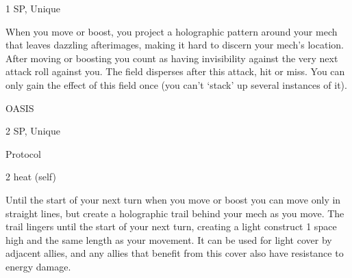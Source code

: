 1 SP, Unique
 
When you move or boost, you project a holographic pattern around your mech that leaves  
dazzling afterimages, making it hard to discern your mech’s location. After moving or boosting  
you count as having invisibility against the very next attack roll against you. The field disperses  
after this attack, hit or miss. You can only gain the effect of this field once (you can’t ‘stack’ up  
several instances of it).
 

OASIS  

2 SP, Unique
 
Protocol
 
2 heat (self)
 
Until the start of your next turn when you move or boost you can move only in straight lines, but  
create a holographic trail behind your mech as you move. The trail lingers until the start of your  
next turn, creating a light construct 1 space high and the same length as your movement. It can  
be used for light cover by adjacent allies, and any allies that benefit from this cover also have  
resistance to energy damage.
 
